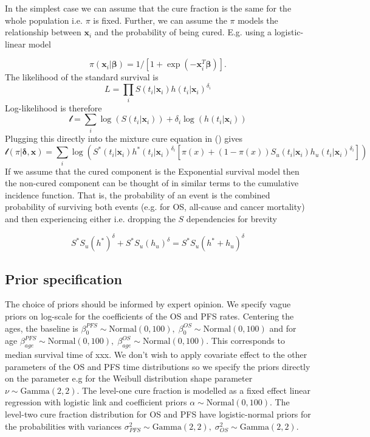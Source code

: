 \documentclass[AMA,STIX1COL]{WileyNJD-v2}
\begin{document}
In the simplest case we can assume that the cure fraction is the same
for the whole population i.e. $\pi$ is fixed. Further, we can assume the
$\pi$ models the relationship between $\boldsymbol{x}_i$ and the
probability of being cured. E.g. using a logistic-linear model

$$
\pi(\boldsymbol{x}_i | \boldsymbol{\beta}) = 1/[1 + \exp(-\boldsymbol{x}_i^T \boldsymbol{\beta})].
$$
The likelihood of the standard survival is
$$
L = \prod_i S(t_i | \boldsymbol{x}_i) h(t_i | \boldsymbol{x}_i)^{\delta_i}
$$
Log-likelihood is therefore
$$
\mathcal{l} = \sum_i \log(S(t_i | \boldsymbol{x}_i)) + \delta_i \log(h(t_i | \boldsymbol{x}_i))
$$
Plugging this directly into the mixture cure equation in (\*) gives
$$
\mathcal{l}(\pi | \boldsymbol{\delta}, \boldsymbol{x}) =
 \sum_i \log(S^*(t_i | \boldsymbol{x}_i) h^*(t_i | \boldsymbol{x}_i)^{\delta_i}[\pi(x) +
   (1 − \pi(x)) S_u(t_i | \boldsymbol{x}_i) h_u(t_i | \boldsymbol{x}_i)^{\delta_i}])
$$
If we assume that the cured component is the Exponential survival model
then the non-cured component can be thought of in similar terms to the
cumulative incidence function. That is, the probability of an event is
the combined probability of surviving both events (e.g. for OS,
all-cause and cancer mortality) and then experiencing either i.e.
dropping the $S$ dependencies for brevity

\begin{equation}
\tag{**}
S^* S_u (h^*)^{\delta} + S^* S_u (h_u)^{\delta} = S^* S_u (h^* + h_u)^{\delta}
\end{equation}

\subsection{Prior specification}
The choice of priors should be informed by expert opinion.
We specify vague priors on log-scale for the coefficients of the OS and PFS rates. Centering the ages, the baseline is $\beta_0^{PFS} \sim \text{Normal}(0, 100),\; \beta_0^{OS} \sim \text{Normal}(0, 100)$ and for age $\beta_{age}^{PFS} \sim \text{Normal}(0, 100),\; \beta_{age}^{OS} \sim \text{Normal}(0, 100)$.
This corresponds to median survival time of xxx.
We don't wish to apply covariate effect to the other parameters of the OS and PFS time distributions so we specify the priors directly on the parameter e.g for the Weibull distribution shape parameter $\nu \sim \text{Gamma}(2, 2)$. 
The level-one cure fraction is modelled as a fixed effect linear regression with logistic link and coefficient priors $\alpha \sim \text{Normal}(0, 100)$.
The level-two cure fraction distribution for OS and PFS have logistic-normal priors for the probabilities with variances $\sigma^2_{PFS} \sim \text{Gamma}(2, 2),\; \sigma^2_{OS} \sim \text{Gamma}(2, 2)$.
\end{document}
